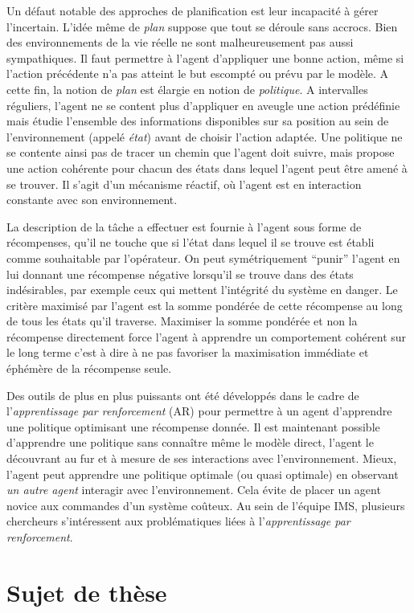 \documentclass[11pt]{article}
\begin{document}
  Un défaut notable des approches de planification est leur incapacité à gérer l'incertain. L'idée même de \emph{plan} suppose que tout se déroule sans accrocs. Bien des environnements de la vie réelle ne sont malheureusement pas aussi sympathiques. Il faut permettre à l'agent d'appliquer une bonne action, même si l'action précédente n'a pas atteint le but escompté ou prévu par le modèle. A cette fin, la notion de \emph{plan} est élargie en notion de \emph{politique}. A intervalles réguliers, l'agent ne se content plus d'appliquer en aveugle une action prédéfinie mais étudie l'ensemble des informations disponibles sur sa position au sein de l'environnement (appelé \emph{état})  avant de choisir l'action adaptée. Une politique ne se contente ainsi pas de tracer un chemin que l'agent doit suivre, mais propose une action cohérente pour chacun des états dans lequel l'agent peut être amené à se trouver. Il s'agit d'un mécanisme réactif, où l'agent est en interaction constante avec son environnement.

  La description de la tâche a effectuer est fournie à l'agent sous forme de récompenses, qu'il ne touche que si l'état dans lequel il se trouve est établi comme souhaitable par l'opérateur. On peut symétriquement ``punir'' l'agent en lui donnant une récompense négative lorsqu'il se trouve dans des états indésirables, par exemple ceux qui mettent l'intégrité du système en danger. Le critère maximisé par l'agent est la somme pondérée de cette récompense au long de tous les états qu'il traverse. Maximiser la somme pondérée et non la récompense directement force l'agent à apprendre un comportement cohérent sur le long terme c'est à dire à ne pas favoriser la maximisation immédiate et éphémère de la récompense seule.

  Des outils de plus en plus puissants ont été développés dans le cadre de l'\emph{apprentissage par renforcement} (AR) pour permettre à un agent d'apprendre une politique optimisant une récompense donnée. Il est maintenant possible d'apprendre une politique sans connaître même le modèle direct, l'agent le découvrant au fur et à mesure de ses interactions avec l'environnement. Mieux, l'agent peut apprendre une politique optimale (ou quasi optimale) en observant \emph{un autre agent} interagir avec l'environnement. Cela évite de placer un agent novice aux commandes d'un système coûteux. Au sein de l'équipe IMS, plusieurs chercheurs s'intéressent aux problématiques liées à l'\emph{apprentissage par renforcement}.
\section{Sujet de thèse}
\label{sec-2}
\end{document}

